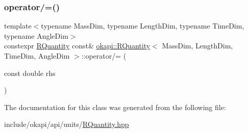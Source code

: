 \mbox{\label{classokapi_1_1RQuantity_ae44a8f9c790bb637ab4c98af87b94db7}} 
\subsubsection{\texorpdfstring{operator/=()}{operator/=()}}
{\footnotesize\ttfamily template$<$typename Mass\+Dim, typename Length\+Dim, typename Time\+Dim, typename Angle\+Dim$>$ \\
constexpr \mbox{\hyperlink{classokapi_1_1RQuantity}{R\+Quantity}} const\& \mbox{\hyperlink{classokapi_1_1RQuantity}{okapi\+::\+R\+Quantity}}$<$ Mass\+Dim, Length\+Dim, Time\+Dim, Angle\+Dim $>$\+::operator/= (\begin{DoxyParamCaption}\item[{const double}]{rhs }\end{DoxyParamCaption})\hspace{0.3cm}{\ttfamily [inline]}}



The documentation for this class was generated from the following file\+:\begin{DoxyCompactItemize}
\item 
include/okapi/api/units/\mbox{\hyperlink{RQuantity_8hpp}{R\+Quantity.\+hpp}}\end{DoxyCompactItemize}
